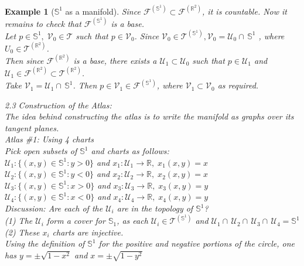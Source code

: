 \documentclass[11pt]{report}
\theoremstyle{thm}
\newtheorem{example}{Example}
\newcommand{\bluetxt}[1]{\textcolor{mp}{#1}}
\newcommand{\vpi}[0]{\medskip \par \noindent}
\begin{document}
\begin{example}[$\mathbb{S}^1$ as a manifold]
Since $\mathcal{F}^{(\mathbb{S}^1)} \subset \mathcal{F}^{(\mathbb{R}^2)}$, it is countable. Now it remains to check that $\mathcal{F}^{(\mathbb{S}^1)}$ is a base.\\[1em]
Let $p\in \mathbb{S}^1,\; \mathcal{V}_0 \in \mathcal{T}$ such that $p\in \mathcal{V}_0$. Since $\mathcal{V}_0 \in \mathcal{T}^{(\mathbb{S}^1)}, \mathcal{V}_0 = \mathcal{U}_0 \cap\, \mathbb{S}^1$ , where $U_0 \in \mathcal{T}^{(\mathbb{R}^2)}$.\\[1em]
Then since $\mathcal{F}^{(\mathbb{R}^2)}$ is a base, there exists a $\mathcal{U}_1 \subset \mathcal{U}_0$ such that $p \in \mathcal{U}_1$ and $ \mathcal{U}_1 \in \mathcal{F}^{(\mathbb{R}^2)} \subset \mathcal{T}^{(\mathbb{R}^2)}$.\\[1em]
Take $\mathcal{V}_1 = \mathcal{U}_1 \cap\, \mathbb{S}^1$. Then $p\in \mathcal{V}_1 \in \mathcal{F}^{(\mathbb{S}^1)}$, where $\mathcal{V}_1 \subset \mathcal{V}_0$ as required.\\
\vpi
\bluetxt{2.3 Construction of the Atlas:}\\[1em]
The idea behind constructing the atlas is to write the manifold as graphs over its tangent planes.\\[1em]
\textit{Atlas \#1: Using 4 charts}\\[1em]
Pick open subsets of $\mathbb{S}^1$ and charts as follows:\\
$\mathcal{U}_1: \{(x,y)\in \mathbb{S}^1: y > 0 \}$ and $ x_1: \mathcal{U}_1 \rightarrow \mathbb{R},\; x_1(x,y)= x$\\
$\mathcal{U}_2: \{(x,y)\in \mathbb{S}^1: y < 0 \}$ and $ x_2: \mathcal{U}_2 \rightarrow \mathbb{R},\; x_2(x,y)= x$\\
$\mathcal{U}_3: \{(x,y)\in \mathbb{S}^1: x > 0 \}$ and $ x_3: \mathcal{U}_3 \rightarrow \mathbb{R},\; x_3(x,y)= y$\\
$\mathcal{U}_4: \{(x,y)\in \mathbb{S}^1: x < 0 \}$ and $ x_4: \mathcal{U}_4 \rightarrow \mathbb{R},\; x_4(x,y)= y$\\[1em]
\textit{Discussion:} Are each of the $\mathcal{U}_i$ are in the topology of $\mathbb{S}^1$?\\[1em]
(1) The $\mathcal{U}_i$ form a cover for $\mathbb{S}_1$, as each $\mathcal{U}_i \in \mathcal{T}^{(\mathbb{S}^1)}$ and $\mathcal{U}_1 \cap\, \mathcal{U}_2 \cap  \, \mathcal{U}_3 \cap \, \mathcal{U}_4 = \mathbb{S}^1$\\[1em]
(2) These $x_i$ charts are injective.\\[1em]
Using the definition of $\mathbb{S}^1$ for the positive and negative portions of the circle, one has $y=\pm\sqrt{1-x^2}$ and $x=\pm\sqrt{1-y^2}$\\[1em]

\end{example}
\end{document}
